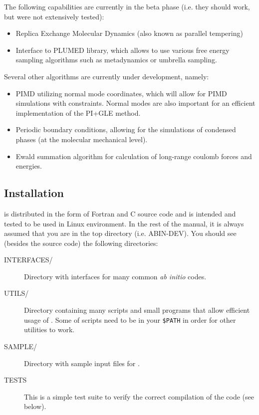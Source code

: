 The following capabilities are currently in the beta phase (i.e. they should work, but were not extensively tested):

\begin{itemize}
\item Replica Exchange Molecular Dynamics (also known as parallel tempering)

\item Interface to PLUMED library, which allows to use various free energy sampling algorithms such as metadynamics or umbrella sampling.
\end{itemize}

Several other algorithms are currently under development, namely:
\begin{itemize}
\item PIMD utilizing normal mode coordinates, which will allow for PIMD simulations with constraints.
Normal modes are also important for an efficient implementation of the PI+GLE method.
\item Periodic boundary conditions, allowing for the simulations of condensed phases (at the molecular mechanical level).
\item Ewald summation algorithm for calculation of long-range coulomb forces and energies.
\end{itemize}

\subsection{Installation}
\abin is distributed in the form of Fortran and C source code and is intended and tested to be used in Linux environment.
In the rest of the manual, it is always assumed that you are in the top \abin directory (i.e. ABIN-DEV). You should see (besides the source code) the following directories:
\begin{description}

\item[INTERFACES/] Directory with interfaces for many common \textit{ab initio} codes.

\item[UTILS/] Directory containing many scripts and small programs that allow efficient usage of \abin. Some of scripts need to be in your \verb|$PATH| in order for other utilities to work.

\item[SAMPLE/] Directory with sample input files for \abin.

\item[TESTS] This is a simple test suite to verify the correct compilation of the code (see below).
\end{description}

